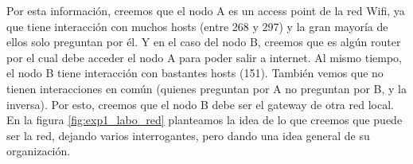 \par Por esta información, creemos que el nodo A es un access point de la red Wifi, ya que tiene interacción con muchos hosts (entre 268 y 297) y la gran mayoría de ellos solo preguntan por él. Y en el caso del nodo B, creemos que es algún router por el cual debe acceder el nodo A para poder salir a internet. Al mismo tiempo, el nodo B tiene interacción con bastantes hosts (151). También vemos que no tienen interacciones en común (quienes preguntan por A no preguntan por B, y la inversa). Por esto, creemos que el nodo B debe ser el gateway de otra red local. En la figura \ref{fig:exp1_labo_red} planteamos la idea de lo que creemos que puede ser la red, dejando varios interrogantes, pero dando una idea general de su organización.

\\
\newpage
